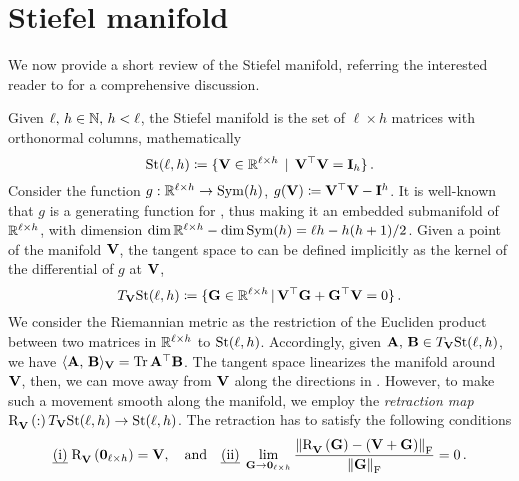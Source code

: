 
\section{Stiefel manifold}\label{app:stiefel}
We now provide a short review of the Stiefel manifold, referring the interested reader to  for a comprehensive discussion.

Given $\ell, \, h \in \mathbb{N}, \, h < \ell$, the Stiefel manifold is the set of $\ell \times h$ matrices with orthonormal columns, mathematically
\begin{equation}\label{eq:stiefel_manifold}
    \mathrm{St}({\ell},{h}) \coloneqq \{ \mathbf{V} \in \mathbb{R}^{\ell \times h} \, \mid \, \mathbf{V}^\top\mathbf{V} = \mathbf{I}_h \}\,.
\end{equation}
Consider the function $g: \mathbb{R}^{\ell \times h} \rightarrow \mathrm{Sym}({h})$, $g(\mathbf{V}) \coloneqq \mathbf{V}^\top \mathbf{V} - \mathbf{I}^h$.
It is well-known that $g$ is a generating function for , thus making it an embedded submanifold of $\mathbb{R}^{\ell \times h}$, with dimension $\mathrm{dim}\, \mathbb{R}^{\ell \times h} - \mathrm{dim}\, \mathrm{Sym}({h}) = \ell h - h(h+1)/2$.
Given a point of the manifold $\mathbf{V}$, the tangent space to  can be defined implicitly as the kernel of the differential of $g$ at $\mathbf{V}$,
\begin{equation}\label{eq:Stiefel_t_space}
    T_{\mathbf{V}}{\mathrm{St}({\ell},{h})}\coloneqq \{ \mathbf{G} \in \mathbb{R}^{\ell \times h} \, | \, \mathbf{V}^\top \mathbf{G} + \mathbf{G}^\top \mathbf{V} = 0 \}\,.
\end{equation}
We consider the Riemannian metric as the restriction of the Eucliden product between two matrices in $\mathbb{R}^{\ell \times h}$ to $\mathrm{St}({\ell},{h})$.
Accordingly, given $\mathbf{A}, \, \mathbf{B} \in T_{\mathbf{V}}{\mathrm{St}({\ell},{h})}$, we have $\langle \mathbf{A}, \, \mathbf{B} \rangle_{\mathbf{V}}= \Tr \mathbf{A}^\top \mathbf{B}$.
The tangent space linearizes the manifold around $\mathbf{V}$, then, we can move away from $\mathbf{V}$ along the directions in . 
However, to make such a movement smooth along the manifold, we employ the \emph{retraction map} $\mathrm{R}^{}_{\mathbf{V}}\left( : \right) T_{\mathbf{V}}{\mathrm{St}({\ell},{h})} \rightarrow \mathrm{St}({\ell},{h})$.
The retraction has to satisfy the following conditions
\begin{equation}
        \text{\emph{(i)}} \; \mathrm{R}^{}_{\mathbf{V}}\left( \boldsymbol{0}_{\ell \times h} \right)=\mathbf{V}, \quad \text{and} \quad \text{\emph{(ii)}} \; \lim_{\mathbf{G} \rightarrow \boldsymbol{0}_{\ell \times h}} \frac{\norm{\mathrm{R}^{}_{\mathbf{V}}\left( \mathbf{G} \right) - (\mathbf{V} + \mathbf{G})}_{\mathrm{F}}}{\norm{\mathbf{G}}_{\mathrm{F}}} = 0\,.
\end{equation}

